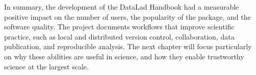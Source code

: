 In summary, the development of the DataLad Handbook had a measurable positive impact on the number of users, the popularity of the package, and the software quality.
The project documents workflows that improve scientific practice, such as local and distributed version control, collaboration, data publication, and reproducible analysis.
The next chapter will focus particularly on why these abilities are useful in science, and how they enable trustworthy science at the largest scale.


\pagebreak

